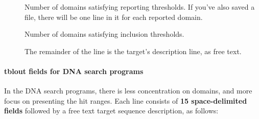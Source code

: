 \begin{description}
\item[] 
  Number of domains satisfying reporting thresholds. If you've also 
  saved a  file, there will be one line in it 
  for each reported domain.

\item[] 
  Number of domains satisfying inclusion thresholds.

\item[] 
  The remainder of the line is the target's description line, as free text.
\end{description}



\paragraph{tblout fields for DNA search programs}

In the DNA search programs, there is less concentration on domains, and more
focus on presenting the hit ranges. Each line consists of \textbf{15
space-delimited fields} followed by a free text target sequence description, as follows:
    
